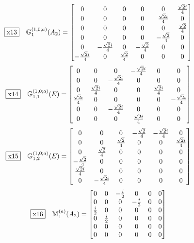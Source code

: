 \documentclass[fleqn,10pt,landscape]{jsarticle}
\begin{document}
\begin{dmath*}
\fbox{x13}\quad \mathbb{G}_{1}^{(1,0;a)}(A_{2})=\begin{bmatrix} 0 & 0 & 0 & 0 & 0 & \frac{\sqrt{2} i}{4} \\ 0 & 0 & 0 & 0 & \frac{\sqrt{2} i}{4} & 0 \\ 0 & 0 & 0 & 0 & 0 & \frac{\sqrt{2}}{4} \\ 0 & 0 & 0 & 0 & - \frac{\sqrt{2}}{4} & 0 \\ 0 & - \frac{\sqrt{2} i}{4} & 0 & - \frac{\sqrt{2}}{4} & 0 & 0 \\ - \frac{\sqrt{2} i}{4} & 0 & \frac{\sqrt{2}}{4} & 0 & 0 & 0 \end{bmatrix}
\end{dmath*}
\begin{dmath*}
\fbox{x14}\quad \mathbb{G}_{1,1}^{(1,0;a)}(E)=\begin{bmatrix} 0 & 0 & 0 & - \frac{\sqrt{2} i}{4} & 0 & 0 \\ 0 & 0 & - \frac{\sqrt{2} i}{4} & 0 & 0 & 0 \\ 0 & \frac{\sqrt{2} i}{4} & 0 & 0 & \frac{\sqrt{2} i}{4} & 0 \\ \frac{\sqrt{2} i}{4} & 0 & 0 & 0 & 0 & - \frac{\sqrt{2} i}{4} \\ 0 & 0 & - \frac{\sqrt{2} i}{4} & 0 & 0 & 0 \\ 0 & 0 & 0 & \frac{\sqrt{2} i}{4} & 0 & 0 \end{bmatrix}
\end{dmath*}
\begin{dmath*}
\fbox{x15}\quad \mathbb{G}_{1,2}^{(1,0;a)}(E)=\begin{bmatrix} 0 & 0 & 0 & - \frac{\sqrt{2}}{4} & - \frac{\sqrt{2} i}{4} & 0 \\ 0 & 0 & \frac{\sqrt{2}}{4} & 0 & 0 & \frac{\sqrt{2} i}{4} \\ 0 & \frac{\sqrt{2}}{4} & 0 & 0 & 0 & 0 \\ - \frac{\sqrt{2}}{4} & 0 & 0 & 0 & 0 & 0 \\ \frac{\sqrt{2} i}{4} & 0 & 0 & 0 & 0 & 0 \\ 0 & - \frac{\sqrt{2} i}{4} & 0 & 0 & 0 & 0 \end{bmatrix}
\end{dmath*}
\begin{dmath*}
\fbox{x16}\quad \mathbb{M}_{1}^{(a)}(A_{2})=\begin{bmatrix} 0 & 0 & - \frac{i}{2} & 0 & 0 & 0 \\ 0 & 0 & 0 & - \frac{i}{2} & 0 & 0 \\ \frac{i}{2} & 0 & 0 & 0 & 0 & 0 \\ 0 & \frac{i}{2} & 0 & 0 & 0 & 0 \\ 0 & 0 & 0 & 0 & 0 & 0 \\ 0 & 0 & 0 & 0 & 0 & 0 \end{bmatrix}
\end{dmath*}
\end{document}

